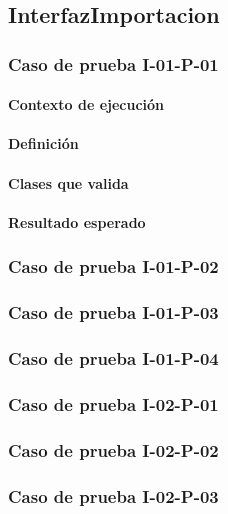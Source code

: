\documentclass[10pt,a4paper]{article}
\begin{document}
	\subsection{InterfazImportacion}
			\subsubsection{Caso de prueba I-01-P-01}
			\paragraph{Contexto de ejecución}
			\paragraph{Definición}
			\paragraph{Clases que valida}
			\paragraph{Resultado esperado}

			\subsubsection{Caso de prueba I-01-P-02}

			\subsubsection{Caso de prueba I-01-P-03}

			\subsubsection{Caso de prueba I-01-P-04}

			\subsubsection{Caso de prueba I-02-P-01}

			\subsubsection{Caso de prueba I-02-P-02}

			\subsubsection{Caso de prueba I-02-P-03}
\end{document}
